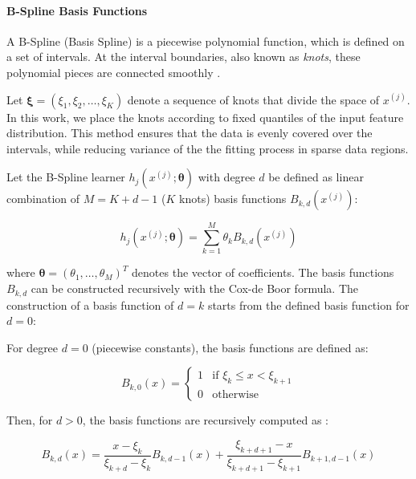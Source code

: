 \documentclass[fontsize=12 pt]{scrartcl}
\begin{document}
\paragraph{B-Spline Basis Functions}

A B-Spline (Basis Spline) is a piecewise polynomial function, which is defined on a set of intervals. At the interval boundaries, also known as \textit{knots}, these polynomial pieces are connected smoothly \citep{Boor1986BasicSplineB}.

Let $\boldsymbol{\xi} = (\xi_1, \xi_2, \dots, \xi_K)$ denote a sequence of knots that divide the space of $x^{(j)}$. In this work, we place the knots according to fixed quantiles of the input feature distribution. This method ensures that the data is evenly covered over the intervals, while reducing variance of the the fitting process in sparse data regions. 

Let the B-Spline learner $h_j(x^{(j)}; \boldsymbol{\theta})$ with degree $d$ be defined as linear combination of $M = K + d - 1$ ($K$ knots) basis functions $B_{k,d}(x^{(j)})$:

\begin{equation}
    h_j(x^{(j)}; \boldsymbol{\theta}) = \sum_{k=1}^{M} \theta_k B_{k,d}(x^{(j)})
\end{equation}

where $\boldsymbol{\theta} = (\theta_1, \dots, \theta_M)^T$ denotes the vector of coefficients. The basis functions $B_{k,d}$ can be constructed recursively with the Cox-de Boor formula. The construction of a basis function of $d=k$ starts from the defined basis function for $d=0$:

For degree $d=0$ (piecewise constants), the basis functions are defined as:

\begin{equation}
    B_{k,0}(x) = 
    \begin{cases} 
    1 & \text{if } \xi_k \leq x < \xi_{k+1} \\
    0 & \text{otherwise}
    \end{cases}
\end{equation}

Then, for $d > 0$, the basis functions are recursively computed as \citep{zhou2023tutorial}:

\begin{equation}
    B_{k,d}(x) = \frac{x - \xi_k}{\xi_{k+d} - \xi_k} B_{k,d-1}(x) + \frac{\xi_{k+d+1} - x}{\xi_{k+d+1} - \xi_{k+1}} B_{k+1,d-1}(x)
\end{equation}
\end{document}
